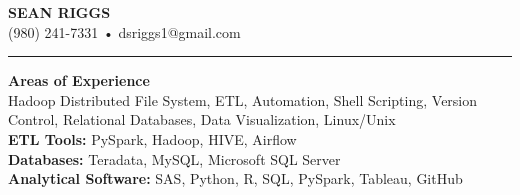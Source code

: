\documentclass[a4paper,10pt]{article}
\begin{document}
\begin{center}
\textbf{\Large SEAN RIGGS}\\
(980) 241-7331 • dsriggs1@gmail.com\vspace{1mm}\\
\hrule height 2pt
\vspace{2mm}
\end{center}

\noindent
\textbf{Areas of Experience}\\
Hadoop Distributed File System,  ETL, Automation, Shell Scripting, Version Control, Relational Databases, Data Visualization, Linux/Unix\\
\textbf{ETL Tools:} PySpark, Hadoop, HIVE, Airflow \\
\textbf{Databases:} Teradata, MySQL, Microsoft SQL Server\\
\textbf{Analytical Software:} SAS, Python, R, SQL, PySpark, Tableau, GitHub\\
\end{document}
